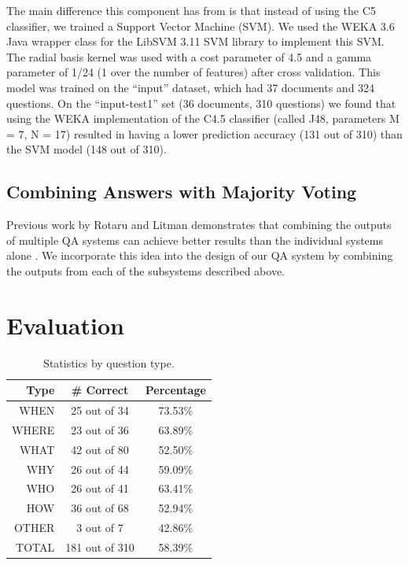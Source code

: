 \documentclass[11pt,letterpaper]{article}
\begin{document}
 The main difference this component has from \cite{Ng00amachine} is that instead of using the C5 classifier, 
 we trained a Support Vector Machine (SVM).  We used the WEKA 3.6 \cite{Hall_theweka} Java wrapper 
 class for the LibSVM 3.11 \cite{Chang01libsvm:a} SVM library to implement this SVM.  The 
 radial basis kernel was used with a cost parameter of 4.5 and a gamma parameter of 1/24 (1 over the number 
 of features) after cross validation.   This model was trained on the ``input'' dataset, which had 37 documents 
 and 324 questions.  On the ``input-test1'' set (36 documents, 310 questions) we found that using the WEKA 
 implementation of the C4.5 classifier (called J48, parameters M = 7, N = 17) resulted in having a lower 
 prediction accuracy (131 out of 310) than the SVM model (148 out of 310).


\subsection{Combining Answers with Majority Voting}
Previous work by Rotaru and Litman demonstrates that combining
the outputs of multiple QA systems can achieve better results than the
individual systems alone \cite{rotaru2005}. We incorporate this idea
into the design of our QA system by combining the outputs from each of
the subsystems described above.


\section{Evaluation}
\label{sec:evaluation}


\begin{table}
\centering

	\begin{tabular}{|r|c|c|}
	\hline
	Type   & \# Correct & Percentage \\
	\hline
	\hline
	WHEN   &  25 out of  34 &  73.53\% \\
	\hline
	WHERE  &  23 out of  36 &  63.89\% \\
	\hline
	WHAT   &  42 out of  80 &  52.50\% \\
	\hline
	WHY    &  26 out of  44 &  59.09\% \\
	\hline
	WHO    &  26 out of  41 &  63.41\% \\
	\hline
	HOW    &  36 out of  68 &  52.94\% \\
	\hline
	OTHER  &   3 out of   7 &  42.86\% \\
	\hline
	\hline
	TOTAL  & 181 out of 310 &  58.39\% \\
	\hline
	\end{tabular}

\caption{Statistics by question type.}
\label{table:question-types}
\end{table}
\end{document}
